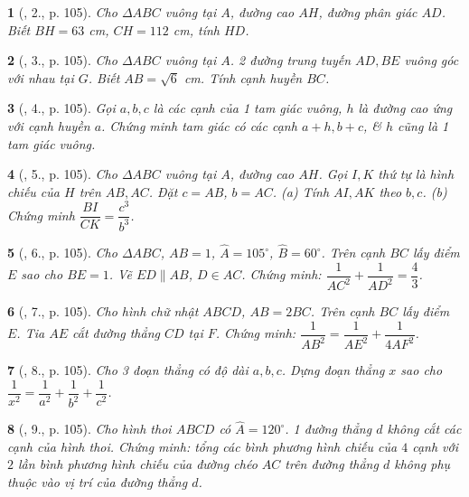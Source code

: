 \documentclass{article}
\newtheorem{baitoan}{}
\begin{document}
\begin{baitoan}[\cite{Tuyen_Toan_9_old}, 2., p. 105]
	Cho $\Delta ABC$ vuông tại $A$, đường cao $AH$, đường phân giác $AD$. Biết $BH = 63$ \emph{cm}, $CH = 112$ \emph{cm}, tính $HD$.
\end{baitoan}

\begin{baitoan}[\cite{Tuyen_Toan_9_old}, 3., p. 105]
	Cho $\Delta ABC$ vuông tại $A$. 2 đường trung tuyến $AD,BE$ vuông góc với nhau tại $G$. Biết $AB = \sqrt{6}$ \emph{cm}. Tính cạnh huyền $BC$.
\end{baitoan}

\begin{baitoan}[\cite{Tuyen_Toan_9_old}, 4., p. 105]
	Gọi $a,b,c$ là các cạnh của 1 tam giác vuông, $h$ là đường cao ứng với cạnh huyền $a$. Chứng minh tam giác có các cạnh $a + h,b + c$, \& $h$ cũng là 1 tam giác vuông.
\end{baitoan}

\begin{baitoan}[\cite{Tuyen_Toan_9_old}, 5., p. 105]
	Cho $\Delta ABC$ vuông tại $A$, đường cao $AH$. Gọi $I,K$ thứ tự là hình chiếu của $H$ trên $AB,AC$. Đặt $c = AB$, $b = AC$. (a) Tính $AI,AK$ theo $b,c$. (b) Chứng minh $\dfrac{BI}{CK} = \dfrac{c^3}{b^3}$.
\end{baitoan}

\begin{baitoan}[\cite{Tuyen_Toan_9_old}, 6., p. 105]
	Cho $\Delta ABC$, $AB = 1$, $\widehat{A} = 105^\circ$, $\widehat{B} = 60^\circ$. Trên cạnh $BC$ lấy điểm $E$ sao cho $BE = 1$. Vẽ $ED\parallel AB$, $D\in AC$. Chứng minh: $\dfrac{1}{AC^2} + \dfrac{1}{AD^2} = \dfrac{4}{3}$.
\end{baitoan}

\begin{baitoan}[\cite{Tuyen_Toan_9_old}, 7., p. 105]
	Cho hình chữ nhật $ABCD$, $AB = 2BC$. Trên cạnh $BC$ lấy điểm $E$. Tia $AE$ cắt đường thẳng $CD$ tại $F$. Chứng minh: $\dfrac{1}{AB^2} = \dfrac{1}{AE^2} + \dfrac{1}{4AF^2}$.
\end{baitoan}

\begin{baitoan}[\cite{Tuyen_Toan_9_old}, 8., p. 105]
	Cho 3 đoạn thẳng có độ dài $a,b,c$. Dựng đoạn thẳng $x$ sao cho $\dfrac{1}{x^2} = \dfrac{1}{a^2} + \dfrac{1}{b^2} + \dfrac{1}{c^2}$.
\end{baitoan}

\begin{baitoan}[\cite{Tuyen_Toan_9_old}, 9., p. 105]
	Cho hình thoi $ABCD$ có $\widehat{A} = 120^\circ$. 1 đường thẳng $d$ không cắt các cạnh của hình thoi. Chứng minh: tổng các bình phương hình chiếu của $4$ cạnh với $2$ lần bình phương hình chiếu của đường chéo $AC$ trên đường thẳng $d$ không phụ thuộc vào vị trí của đường thẳng $d$.
\end{baitoan}
\end{document}
